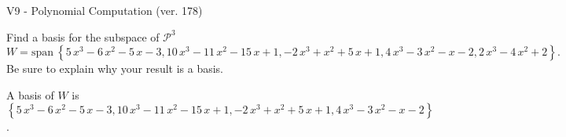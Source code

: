 \begin{exercise}
  \begin{exerciseTitle}V9 - Polynomial Computation (ver. 178)\end{exerciseTitle}
  \begin{exerciseStatement}
    Find a basis for the subspace of \(\mathcal{P}^3\) 
\[W=\mathrm{span}\ \left\{5 \, x^{3} - 6 \, x^{2} - 5 \, x - 3 , 10 \, x^{3} - 11 \, x^{2} - 15 \, x + 1 , -2 \, x^{3} + x^{2} + 5 \, x + 1 , 4 \, x^{3} - 3 \, x^{2} - x - 2 , 2 \, x^{3} - 4 \, x^{2} + 2\right\}.\]
 Be sure to explain why your result is a basis.


  \end{exerciseStatement}
  \begin{exerciseAnswer}
   A basis of \(W\) is  \(\left\{5 \, x^{3} - 6 \, x^{2} - 5 \, x - 3 , 10 \, x^{3} - 11 \, x^{2} - 15 \, x + 1 , -2 \, x^{3} + x^{2} + 5 \, x + 1 , 4 \, x^{3} - 3 \, x^{2} - x - 2\right\}\).
  


  \end{exerciseAnswer}
\end{exercise}